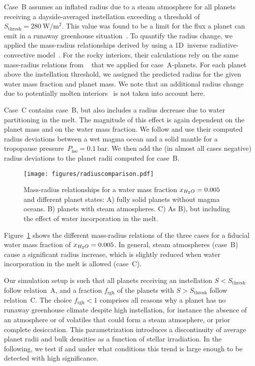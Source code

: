 \documentclass[twocolumn]{aastex631}
\begin{document}
Case~B assumes an inflated radius due to a steam atmosphere for all planets receiving a dayside-averaged instellation exceeding a threshold of $S_\mathrm{thresh} = \SI{280}{\watt\per\meter\squared}$.
This value was found to be a limit for the flux a planet can emit in a runaway greenhouse situation~\citep{Goldblatt2013,Leconte2013}.
To quantify the radius change, we applied the mass-radius relationships derived by \citet{Turbet2020} using a 1D~inverse radiative-convective model~\citep{Turbet2019}.
For the rocky interiors, their calculations rely on the same mass-radius relations from ~\citep{Zeng2016} that we applied for case~A-planets.
For each planet above the instellation threshold, we assigned the predicted radius for the given water mass fraction and planet mass.
We note that an additional radius change due to potentially molten interiors~\citep{Bower2019} is not taken into account here.

Case~C contains case~B, but also includes a radius decrease due to water partitioning in the melt.
The magnitude of this effect is again dependent on the planet mass and on the water mass fraction.
We follow \citet{Dorn2021} and use their computed radius deviations between a wet magma ocean and a solid mantle for a tropopause pressure~$P_\mathrm{iso}=\SI{0.1}{\bar}$.
We then add the (in almost all cases negative) radius deviations to the planet radii computed for case~B.

\begin{figure}
    \begin{centering}
        \texttt{[image: figures/radiuscomparison.pdf]}
        \caption{Mass-radius relationships for a water mass fraction $x_{H_2O}= 0.005$ and different planet states: A) fully solid planets without magma oceans. B) planets with steam atmospheres. C) As B), but including the effect of water incorporation in the melt.}
        \label{fig:radiuscomparison}
    \end{centering}
\end{figure}

Figure~\ref{fig:radiuscomparison} shows the different mass-radius relations of the three cases for a fiducial water mass fraction of $x_{H_2O}= 0.005$.
In general, steam atmospheres (case~B) cause a significant radius increase, which is slightly reduced when water incorporation in the melt is allowed (case~C).

Our simulation setup is such that all planets receiving an instellation $S < S_\mathrm{thresh}$ follow relation~A, and a fraction $f_\mathrm{rgh}$ of the planets with $S > S_\mathrm{thresh}$ follow relation~C.
The choice $f_\mathrm{rgh} < 1$ comprises all reasons why a planet has no runaway greenhouse climate despite high instellation, for instance the absence of an atmosphere or of volatiles that could form a steam atmosphere, or prior complete desiccation.
This parametrization introduces a discontinuity of average planet radii and bulk densities as a function of stellar irradiation.
In the following, we test if and under what conditions this trend is large enough to be detected with high significance.
\end{document}
